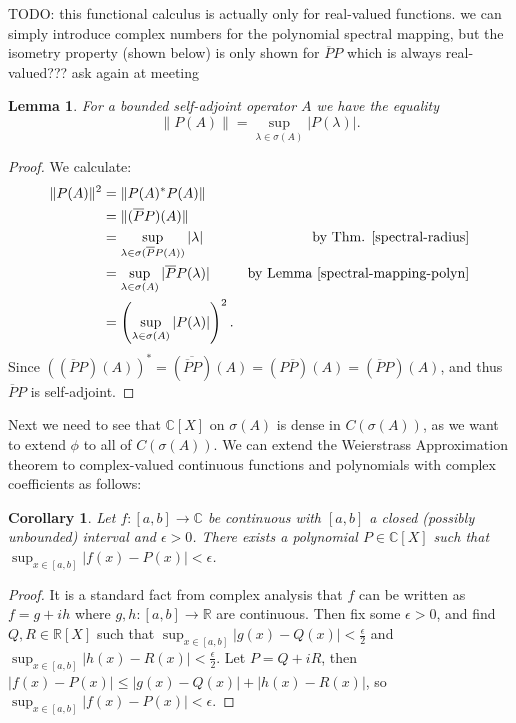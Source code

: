 \documentclass[12pt,oneside]{report}
\newtheorem{cor}[thm]{Corollary}
\newtheorem{lem}[thm]{Lemma}
\begin{document}
 TODO: this functional calculus is actually only for real-valued functions. we can simply introduce complex numbers for the polynomial spectral mapping, but the isometry property (shown below) is only shown for $\overline{P}P$ which is always real-valued??? ask again at meeting

\begin{lem}
    For a bounded self-adjoint operator $A$ we have the equality $$\|P(A)\| = \sup_{\lambda \in \sigma(A)} |P(\lambda)|.$$
\end{lem}
\begin{proof}
    We calculate:
\begin{align*}
\|P(A)\|^{2} &= \|P(A)^{*}P(A)\| \\
&= \|(\overline{P}P)(A)\| \\
&= \sup_{\lambda \in \sigma(\overline{P}P(A))} |\lambda| & \text{by Thm. \ref{spectral-radius}} \\
&= \sup_{\lambda \in \sigma(A)} |\overline{P}P(\lambda)| & \text{by Lemma \ref{spectral-mapping-polyn}} \\
&= \left( \sup_{\lambda \in \sigma(A)} |P(\lambda)| \right)^{2}.
\end{align*}
Since $((\overline{P}P)(A))^{*} = (\overline{\overline{P}P})(A) = (P\overline{P})(A) = (\overline{P}P)(A)$, and thus $\overline{P}P$ is self-adjoint.
\end{proof}

Next we need to see that $\mathbb{C}[X]$ on $\sigma(A)$ is dense in $C(\sigma(A))$, as we want to extend $\phi$ to all of $C(\sigma(A))$. We can extend the Weierstrass Approximation theorem to complex-valued continuous functions and polynomials with complex coefficients as follows:

\begin{cor}
    Let $f: [a,b] \to \mathbb{\mathbb{C}}$ be continuous with $[a,b]$ a closed (possibly unbounded) interval and $\epsilon > 0$. There exists a polynomial $P \in \mathbb{\mathbb{C}}[X]$ such that $\sup_{x \in [a,b]}|f(x) - P(x)| < \epsilon$.
\end{cor}
\begin{proof}
    It is a standard fact from complex analysis that $f$ can be written as $f = g + ih$ where $g,h: [a,b] \to \mathbb{R}$ are continuous. Then fix some $\epsilon > 0$, and find $Q,R \in \mathbb{R}[X]$ such that $\sup_{x\in[a,b]} |g(x) - Q(x)| < \frac{\epsilon}{2}$ and $\sup_{x\in[a,b]} |h(x) - R(x)| < \frac{\epsilon}{2}$. Let $P = Q + iR$, then $|f(x) - P(x)| \leq |g(x) - Q(x)| + |h(x) - R(x)|$, so $\sup_{x\in[a,b]}|f(x) - P(x)| < \epsilon$.
\end{proof}
\end{document}
